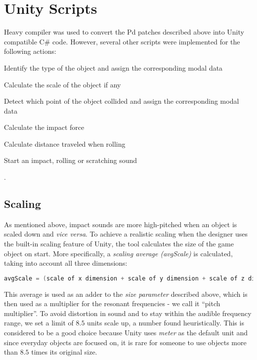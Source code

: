 \section{Unity\textsuperscript{\textregistered} Scripts}
Heavy \cite{bib:heavy} compiler was used to convert the \gls{Pd} patches described above into Unity\textsuperscript{\textregistered} compatible C\# code. However, several other scripts were implemented for the following actions: 
\begin{inparaenum}[1)]
\item Identify the type of the object and assign the corresponding modal data
\item Calculate the scale of the object if any
\item Detect which point of the object collided and assign the corresponding modal data
\item Calculate the impact force
\item Calculate distance traveled when rolling
\item Start an impact, rolling or scratching sound 
\end{inparaenum}.   

\subsection{Scaling}
As mentioned above, impact sounds are more high-pitched when an object is scaled down and \textit{vice versa}. To achieve a realistic scaling when the designer uses the built-in scaling feature of Unity\textsuperscript{\textregistered}, the tool calculates the size of the game object on start. More specifically, a \textit{scaling average (avgScale)} is calculated, taking into account all three dimensions:

\begin{lstlisting}[language=C]
avgScale = (scale of x dimension + scale of y dimension + scale of z dimension) / 3
\end{lstlisting}

This average is used as an adder to the \textit{size parameter} described above, which is then used as a multiplier for the resonant frequencies - we call it ``pitch multiplier''. To avoid distortion in sound and to stay within the audible frequency range, we set a limit of $8.5$ units scale up, a number found heuristically. This is considered to be a good choice because Unity\textsuperscript{\textregistered} uses \textit{meter} as the default unit and since everyday objects are focused on, it is rare for someone to use objects more than $8.5$ times its original size.


